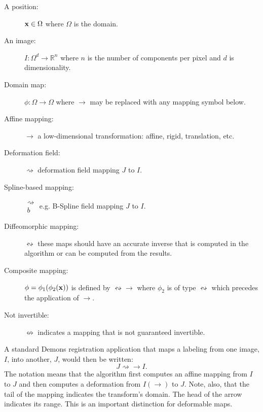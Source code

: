 \documentclass{llncs}
\begin{document}
\begin{description}
\item [A position:] ${\bf x} \in \Omega$ where $\Omega$ is the domain. 
\item [An image:]  $ I \colon \Omega^d \to \mathbb{R}^n$ where $n$ is the
  number of components per pixel and $d$ is dimensionality.
\item [Domain map:] $ \phi \colon \Omega  \to \Omega $ where $\to$ may be
  replaced with any mapping symbol below. 
\item [Affine mapping:] $\rightarrow$ a low-dimensional
  transformation: affine, rigid, translation, etc. 
\item [Deformation field:] $ \rightsquigarrow$ deformation field mapping $J$
  to $I$.
\item [Spline-based mapping:] $\substack{
   \rightsquigarrow \\
   b
  }$ e.g. B-Spline field mapping $J$
  to $I$.
\item [Diffeomorphic mapping:] $ \leftrightsquigarrow$ these maps
  should have an accurate inverse that is computed in the algorithm or can be computed from the results.
\item [Composite mapping:] $\phi=\phi_1(\phi_2({\bf x}))$ is defined by $\leftrightsquigarrow
  \rightarrow$ where $\phi_2$ is of type $\leftrightsquigarrow$ which precedes the application of $\rightarrow$.
\item[Not invertible:]  $\nleftrightarrow$ indicates a mapping that is
  not guaranteed invertible.
\end{description}
A standard Demons registration application that maps a labeling from
one image, $I$, into another, $J$, would then be written:
$$
J \rightsquigarrow \rightarrow  I .
$$
The notation means that the algorithm first computes an affine mapping
from $I$ to $J$ and then computes a deformation from $I( \rightarrow )$
to $J$.  Note, also, that the tail of the mapping indicates the
transform's domain.  The head of the arrow indicates its range.  This
is an important distinction for deformable maps. 
\end{document}
